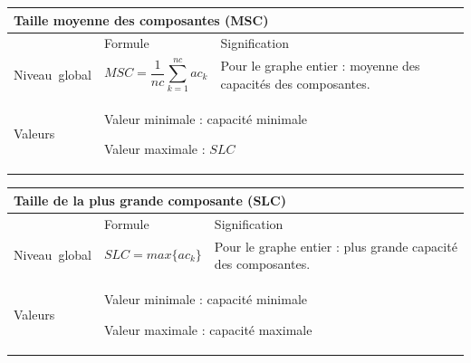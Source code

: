 \documentclass{article}
\begin{document}
\begin{table}[H]
\begin{tabular}{|m{3.24cm}|m{4.4810004cm}m{7.924cm}|}

\hline
\multicolumn{3}{|m{16.044998cm}|}{Taille moyenne des composantes (MSC)}\\\hline
 &
\multicolumn{1}{m{4.4810004cm}|}{Formule} &
Signification\\\hline
Niveau~global &
\multicolumn{1}{m{4.4810004cm}|}{\begin{equation*}
\mathit{MSC}=\frac{1}{\mathit{nc}}\sum _{k=1}^{\mathit{nc}}{{\mathit{ac}}_{k}}
\end{equation*}
} &
Pour le graphe entier : moyenne des capacités des composantes.

\\\hline
Valeurs &
\multicolumn{2}{m{12.6050005cm}|}{Valeur minimale : capacité minimale

Valeur maximale :  $\mathit{SLC}$

}\\\hline
\end{tabular}
\end{table}


\begin{table}[H]
\begin{tabular}{|m{3.24cm}|m{4.4810004cm}m{7.924cm}|}

\hline
\multicolumn{3}{|m{16.044998cm}|}{Taille de la plus grande composante (SLC)}\\\hline
 &
\multicolumn{1}{m{4.4810004cm}|}{Formule} &
Signification\\\hline
Niveau~global &
\multicolumn{1}{m{4.4810004cm}|}{\begin{equation*}
\mathit{SLC}=\mathit{max}\{{\mathit{ac}}_{k}\}
\end{equation*}
} &
Pour le graphe entier : plus grande capacité des composantes.

\\\hline
Valeurs &
\multicolumn{2}{m{12.6050005cm}|}{Valeur minimale : capacité minimale

Valeur maximale : capacité maximale

}\\\hline
\end{tabular}
\end{table}
\end{document}
